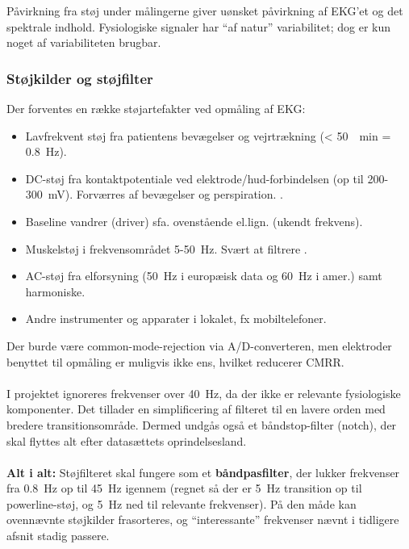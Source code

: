 \documentclass[a4paper]{report}
\newcommand{\sbul}{\begin{itemize}}
\newcommand{\ebul}{\end{itemize}}
\begin{document}
        \begin{par}

Påvirkning fra støj under målingerne giver uønsket påvirkning af EKG'et og det spektrale indhold.
Fysiologiske signaler har ``af natur'' variabilitet; dog er kun noget af variabiliteten brugbar.

\end{par} 
\begin{par}

\subsubsection{Støjkilder og støjfilter}
Der forventes en række støjartefakter ved opmåling af EKG:
\sbul
 \item Lavfrekvent støj fra patientens bevægelser og
  vejrtrækning (< \SI{50}{\per\minute} = \SI{0.8}{\hertz}).
 \item DC-støj fra kontaktpotentiale ved elektrode/hud-forbindelsen
  (op til 200-\SI{300}{\milli\volt}). Forværres af bevægelser og
  perspiration. \cite{emsfilter}.
 \item Baseline vandrer (driver) sfa. ovenstående el.lign. (ukendt frekvens).
 \item Muskelstøj i frekvensområdet 5-\SI{50}{\hertz}. Svært at filtrere \cite{emsfilter}.
 \item AC-støj fra elforsyning (\SI{50}{\hertz} i
    europæisk data og \SI{60}{\hertz} i amer.) samt harmoniske.
 \item Andre instrumenter og apparater i lokalet, fx mobiltelefoner.
\ebul
Der burde være common-mode-rejection via A/D-converteren, men elektroder
benyttet til opmåling er muligvis ikke ens, hvilket reducerer CMRR.
\\ \\
I projektet ignoreres frekvenser over \SI{40}{\hertz}, da der ikke er relevante fysiologiske komponenter.
Det tillader en simplificering af filteret til en lavere orden med bredere transitionsområde.
Dermed undgås også et båndstop-filter (notch), der skal flyttes alt efter datasættets oprindelsesland.
\\ \\
\textbf{Alt i alt:} Støjfilteret skal fungere som et \textbf{båndpasfilter},
der lukker frekvenser fra \SI{0.8}{\hertz} op til \SI{45}{\hertz} igennem
(regnet så der er \SI{5}{\hertz} transition op til powerline-støj, og \SI{5}{\hertz} ned til relevante frekvenser).
På den måde kan ovennævnte støjkilder frasorteres, og ``interessante'' frekvenser nævnt i tidligere afsnit stadig passere.

\end{par} 
\end{document}
